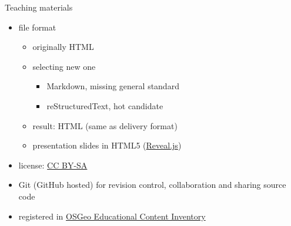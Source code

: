 \documentclass[xcolor={dvipsnames,usenames},beamer,aspectratio=169]{beamer}
\begin{document}
\begin{frame}{Teaching materials}

\begin{itemize}
 \item file format
 \begin{itemize}
  \item originally HTML
  \item selecting new one
  \begin{itemize}
   \item Markdown, missing general standard
   \item reStructuredText, hot candidate
  \end{itemize}
  \item result: HTML (same as delivery format)
  \item presentation slides in HTML5 (\href{http://lab.hakim.se/reveal-js}{Reveal.js})
 \end{itemize}
 \item license: \href{https://creativecommons.org/licenses/by-sa/4.0/}{CC BY-SA}
 \item Git (GitHub hosted)
  {\scriptsize for revision control, collaboration and sharing source code}
 \item registered in \href{http://www.osgeo.org/educational_content}{OSGeo Educational Content Inventory}
\end{itemize}


\end{frame}
\end{document}
